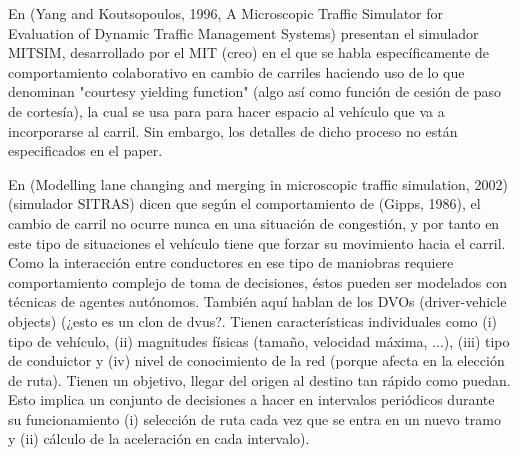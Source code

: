 En (Yang and Koutsopoulos, 1996, A Microscopic Traffic Simulator for Evaluation of Dynamic Traffic Management Systems) presentan el simulador MITSIM, desarrollado por el MIT (creo) en el que se habla específicamente de comportamiento colaborativo en cambio de carriles haciendo uso de lo que denominan "courtesy yielding function" (algo así como función de cesión de paso de cortesía), la cual se usa para para hacer espacio al vehículo que va a incorporarse al carril. Sin embargo, los detalles de dicho proceso no están especificados en el paper.

En (Modelling lane changing and merging in microscopic traffic simulation, 2002) (simulador SITRAS) dicen que según el comportamiento de (Gipps, 1986), el cambio de carril no ocurre nunca en una situación de congestión, y por tanto en este tipo de situaciones el vehículo tiene que forzar su movimiento hacia el carril. Como la interacción entre conductores en ese tipo de maniobras requiere comportamiento complejo de toma de decisiones, éstos pueden ser modelados con técnicas de agentes autónomos. También aquí hablan de los DVOs (driver-vehicle objects) (¿esto es un clon de \glspl{dvu}?. Tienen características individuales como (i) tipo de vehículo, (ii) magnitudes físicas (tamaño, velocidad máxima, ...), (iii) tipo de conduictor y (iv) nivel de conocimiento de la red (porque afecta en la elección de ruta). Tienen un objetivo, llegar del origen al destino tan rápido como puedan. Esto implica un conjunto de decisiones a hacer en intervalos periódicos durante su funcionamiento (i) selección de ruta cada vez que se entra en un nuevo tramo y (ii) cálculo de la aceleración en cada intervalo).

